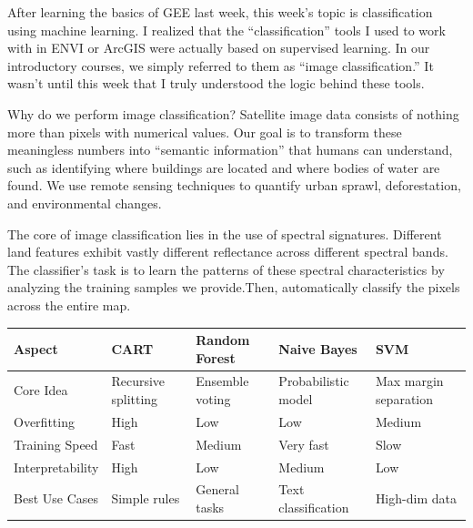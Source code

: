 \documentclass[
  letterpaper,
  DIV=11,
  numbers=noendperiod]{scrreprt}
\begin{document}
After learning the basics of GEE last week, this week's topic is
classification using machine learning. I realized that the
``classification'' tools I used to work with in ENVI or ArcGIS were
actually based on supervised learning. In our introductory courses, we
simply referred to them as ``image classification.'' It wasn't until
this week that I truly understood the logic behind these tools.

Why do we perform image classification? Satellite image data consists of
nothing more than pixels with numerical values. Our goal is to transform
these meaningless numbers into ``semantic information'' that humans can
understand, such as identifying where buildings are located and where
bodies of water are found. We use remote sensing techniques to quantify
urban sprawl, deforestation, and environmental changes.

The core of image classification lies in the use of spectral signatures.
Different land features exhibit vastly different reflectance across
different spectral bands. The classifier's task is to learn the patterns
of these spectral characteristics by analyzing the training samples we
provide.Then, automatically classify the pixels across the entire map.

\begin{longtable}[]{@{}
  >{\raggedright\arraybackslash}p{}
  >{\raggedright\arraybackslash}p{}
  >{\raggedright\arraybackslash}p{}
  >{\raggedright\arraybackslash}p{}
  >{\raggedright\arraybackslash}p{}@{}}
\toprule\noalign{}
\begin{minipage}[b]{\linewidth}\raggedright
Aspect
\end{minipage} & \begin{minipage}[b]{\linewidth}\raggedright
CART
\end{minipage} & \begin{minipage}[b]{\linewidth}\raggedright
Random Forest
\end{minipage} & \begin{minipage}[b]{\linewidth}\raggedright
Naive Bayes
\end{minipage} & \begin{minipage}[b]{\linewidth}\raggedright
SVM
\end{minipage} \\
\midrule\noalign{}
\endhead
\bottomrule\noalign{}
\endlastfoot
Core Idea & Recursive splitting & Ensemble voting & Probabilistic model
& Max margin separation \\
Overfitting & High & Low & Low & Medium \\
Training Speed & Fast & Medium & Very fast & Slow \\
Interpretability & High & Low & Medium & Low \\
Best Use Cases & Simple rules & General tasks & Text classification &
High-dim data \\
\end{longtable}
\end{document}
